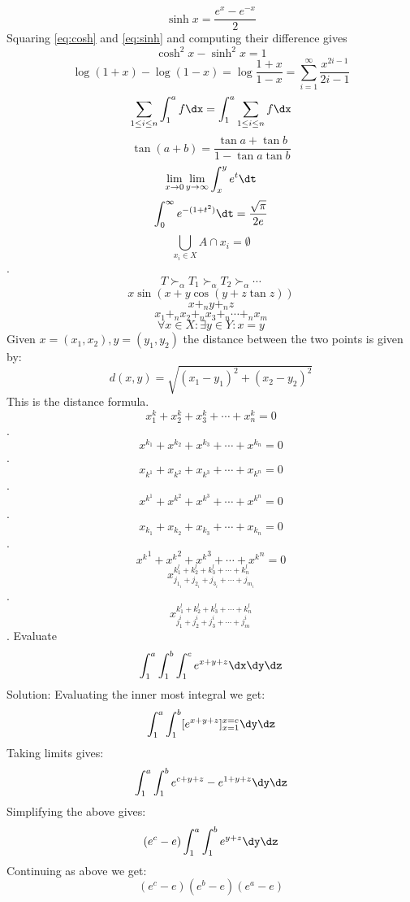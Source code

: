 \begin{equation}
\sinh x = \frac{e^x-e^{-x}}{2} \label{eq:sinh}
\end{equation}
Squaring  \ref{eq:cosh} and \ref{eq:sinh} and computing their
difference gives
$$\cosh^2x -\sinh^2 x = 1$$
$$\log (1+x) - \log (1-x) = \log \frac{1+x}{1-x} = \sum_{i=1}^\infty
\frac{x^{2i-1}}{2i -1}$$
$$\sum_{1 \leq i \leq n} \int_1^a f\dx = \int_1^a \sum_{1\leq i \leq n
} f \dx $$
$$\tan (a+b) =\frac{\tan a + \tan b}{  1 - \tan a \tan b}$$
$$\lim_{x\to0}\lim_{y\to\infty}\int_x^ye^t\dt$$
$$\int_0^\infty e^{-(1+t^2)} \dt = \frac{\sqrt{\pi}}{2e}$$
$$\bigcup_{x_i \in X} A\cap x_i = \emptyset$$.
$$T\succ_\alpha T_1 \succ_\alpha T_2 \succ_\alpha \cdots$$
$$x\sin(x+y\cos (y+z\tan z))$$
$$x +_n y +_n z$$
$$x_1 +_n x_2 +_n x_3 +_n \cdots +_n x_m$$
$$\forall x \in X:    \exists y \in Y :   x=y$$
Given $x=(x_1,x_2), y=(y_1,y_2)$ the distance between the two points
is given by:
$$d(x,y) = \sqrt{(x_1-y_1)^2 +(x_2-y_2)^2} $$
This is the distance formula.
$$x^k_1 +x^k_2 + x^k_3 + \cdots + x^k_n = 0$$.
$$x^{k_1} + x^{k_2} + x^{k_3} + \cdots + x^{k_n} = 0$$.
$$x_{k^1}+x_{k^2}+x_{k^3}+\cdots+x_{k^n}=0$$.
$$x^{k^1}+x^{k^2}+x^{k^3}+\cdots+x^{k^n}=0$$.
$$x_{k_1}+x_{k_2}+x_{k_3}+\cdots+x_{k_n}=0$$.
$${x^k}^1 +{x^k}^2 +{x^k}^3 + \cdots + {x^k}^n = 0$$
$$x^{k_1^l+k_2^l+k_3^l+\cdots+k_n^l}_{j_{1_i}+j_{2_i}+j_{3_i}+\cdots+j_{m_i}}$$.
$$x^{k_1^l+k_2^l+k_3^l+\cdots+k_n^l}_{j_1^i+j_2^i+j_3^i+\cdots+j_m^i}$$.
Evaluate
$$\int_1^a \int_1^b\int_1^c e^{x+y+z}\dx\dy\dz$$
Solution:
Evaluating the inner most integral we get:
$$\int_1^a \int_1^b[e^{x+y+z}]_{x=1}^{x=c}\dy\dz$$
Taking limits gives:
$$\int_1^a \int_1^be^{c+y+z}-e^{1+y+z}\dy\dz$$
Simplifying the above gives:
$$(e^c-e)\int_1^a\int_1^b e^{y+z}\dy\dz$$
Continuing as above we get:
$$(e^c-e)(e^b-e)(e^a-e)$$

